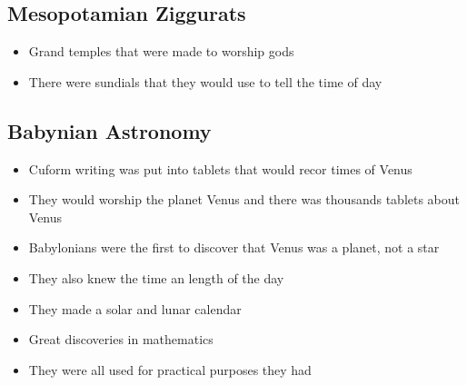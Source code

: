 \documentclass{article}
\begin{document}
\subsection{Mesopotamian Ziggurats}
\begin{itemize}
  \item Grand temples that were made to worship gods
  \item There were sundials that they would use to
    tell the time of day
\end{itemize}

\subsection{Babynian Astronomy}
\begin{itemize}
  \item Cuform writing was put into tablets that would recor times of Venus
  \item They would worship the planet Venus and there was thousands tablets
    about Venus
  \item Babylonians were the first to discover that
    Venus was a planet, not a star
  \item They also knew the time an length of the day
  \item They made a solar and lunar calendar
  \item Great discoveries in mathematics
  \item They were all used for practical purposes they had
\end{itemize}
\end{document}
